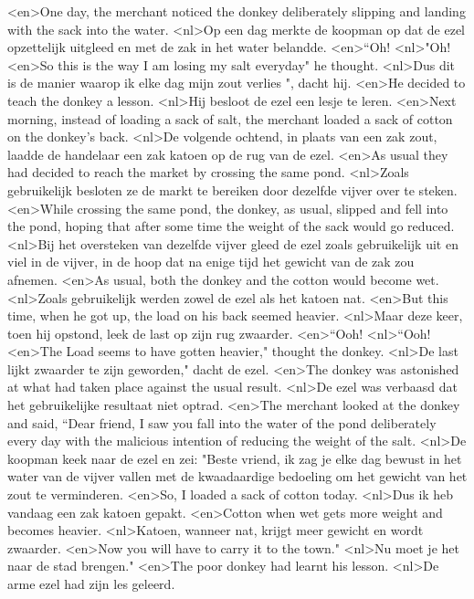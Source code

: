 <en>One day, the merchant noticed the donkey deliberately slipping and landing with the sack into the water.
<nl>Op een dag merkte de koopman op dat de ezel opzettelijk uitgleed en met de zak in het water belandde.
<en>“Oh!
<nl>"Oh!
<en>So this is the way I am losing my salt everyday" he thought.
<nl>Dus dit is de manier waarop ik elke dag mijn zout verlies ", dacht hij.
<en>He decided to teach the donkey a lesson.
<nl>Hij besloot de ezel een lesje te leren.
<en>Next morning, instead of loading a sack of salt, the merchant loaded a sack of cotton on the donkey’s back.
<nl>De volgende ochtend, in plaats van een zak zout, laadde de handelaar een zak katoen op de rug van de ezel.
<en>As usual they had decided to reach the market by crossing the same pond.
<nl>Zoals gebruikelijk  besloten ze   de markt te bereiken door  dezelfde vijver over te steken.
<en>While crossing the same pond, the donkey, as usual, slipped and fell into the pond, hoping that after some time the weight of the sack would go reduced.
<nl>Bij het oversteken van dezelfde vijver gleed de ezel zoals gebruikelijk uit en viel in de vijver, in de hoop dat na enige tijd het gewicht van de zak zou afnemen.
<en>As usual, both the donkey and the cotton would become wet.
<nl>Zoals gebruikelijk werden zowel de ezel als het katoen nat.
<en>But this time, when he got up, the load on his back seemed heavier.
<nl>Maar deze keer, toen hij opstond, leek de last op zijn rug zwaarder.
<en>“Ooh!
<nl>“Ooh!
<en>The Load seems to have gotten heavier," thought the donkey.
<nl>De last lijkt zwaarder te zijn geworden," dacht de ezel.
<en>The donkey was astonished at what had taken place against the usual result.
<nl>De ezel was  verbaasd dat  het gebruikelijke resultaat niet optrad.
<en>The merchant looked at the donkey and said, “Dear friend, I saw you fall into the water of the pond deliberately every day with the malicious intention of reducing the weight of the salt.
<nl>De koopman keek naar de ezel en zei: "Beste vriend, ik zag je elke dag bewust in het water van de vijver vallen met de kwaadaardige bedoeling om het gewicht van het zout te verminderen.
<en>So, I loaded a sack of cotton today.
<nl>Dus ik heb vandaag een zak katoen gepakt.
<en>Cotton when wet gets more weight and becomes heavier.
<nl>Katoen, wanneer nat, krijgt meer gewicht en wordt zwaarder.
<en>Now you will have to carry it to the town."
<nl>Nu moet je het naar de stad brengen."
<en>The poor donkey had learnt his lesson.
<nl>De arme ezel had zijn les geleerd.
